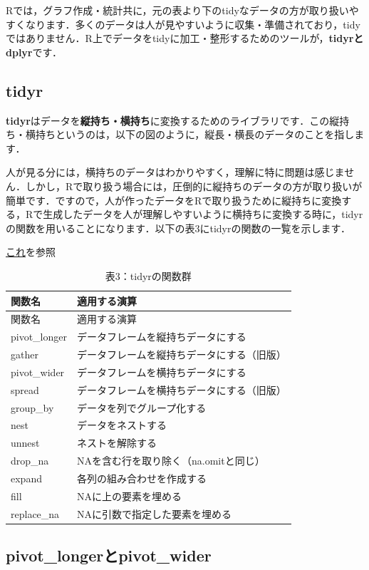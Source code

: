 \documentclass[
  letterpaper,
  DIV=11,
  numbers=noendperiod]{scrreprt}
\begin{document}
Rでは，グラフ作成・統計共に，元の表より下のtidyなデータの方が取り扱いやすくなります．多くのデータは人が見やすいように収集・準備されており，tidyではありません．R上でデータをtidyに加工・整形するためのツールが，\textbf{tidyrとdplyr}です．

\hypertarget{tidyr}{%
\subsection{tidyr}\label{tidyr}}

\textbf{tidyr}はデータを\textbf{縦持ち・横持ち}に変換するためのライブラリです．この縦持ち・横持ちというのは，以下の図のように，縦長・横長のデータのことを指します．

人が見る分には，横持ちのデータはわかりやすく，理解に特に問題は感じません．しかし，Rで取り扱う場合には，圧倒的に縦持ちのデータの方が取り扱いが簡単です．ですので，人が作ったデータをRで取り扱うために縦持ちに変換する，Rで生成したデータを人が理解しやすいように横持ちに変換する時に，tidyrの関数を用いることになります．以下の表3にtidyrの関数の一覧を示します．

\href{https://rstudio.github.io/cheatsheets/tidyr.pdf}{これ}を参照

\begin{longtable}[]{@{}ll@{}}
\caption{表3：tidyrの関数群}\tabularnewline
\toprule()
関数名 & 適用する演算 \\
\midrule()
\endfirsthead
\toprule()
関数名 & 適用する演算 \\
\midrule()
\endhead
pivot\_longer & データフレームを縦持ちデータにする \\
gather & データフレームを縦持ちデータにする（旧版） \\
pivot\_wider & データフレームを横持ちデータにする \\
spread & データフレームを横持ちデータにする（旧版） \\
group\_by & データを列でグループ化する \\
nest & データをネストする \\
unnest & ネストを解除する \\
drop\_na & NAを含む行を取り除く（na.omitと同じ） \\
expand & 各列の組み合わせを作成する \\
fill & NAに上の要素を埋める \\
replace\_na & NAに引数で指定した要素を埋める \\
\bottomrule()
\end{longtable}

\hypertarget{pivot_longerux3068pivot_wider}{%
\subsection{pivot\_longerとpivot\_wider}\label{pivot_longerux3068pivot_wider}}
\end{document}
